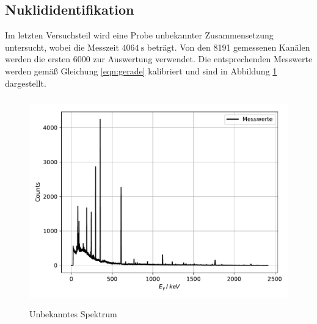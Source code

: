 \subsection{Nuklididentifikation}
Im letzten Versuchsteil wird eine Probe unbekannter Zusammensetzung untersucht, wobei die
Messzeit $\SI{4064}{\second}$ beträgt. Von den 8191 gemessenen Kanälen werden die ersten 6000 zur Auswertung
verwendet. Die entsprechenden Messwerte werden gemäß Gleichung \ref{eqn:gerade} kalibriert und
sind in Abbildung \ref{fig:plot8} dargestellt.
\begin{figure}
  \centering
  \includegraphics[height=9cm]{Un.pdf}
  \caption{Unbekanntes Spektrum}
  \label{fig:plot8}
\end{figure}


